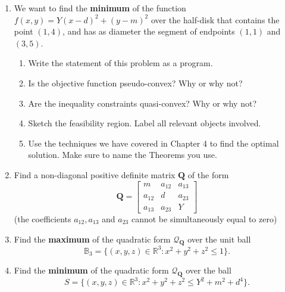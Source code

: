 \documentclass[11pt]{article}
\theoremstyle{definition}
\begin{document}
\begin{enumerate}
    \item We want to find the \textbf{minimum} of the function $f(x,y) = Y(x-d)^2 + (y-m)^2$ over the half-disk that contains the point $(1,4)$, and has as diameter the segment of endpoints $(1,1)$ and $(3,5)$.
    \begin{enumerate}
        \item Write the statement of this problem as a program.
        \item Is the objective function pseudo-convex?  Why or why not?
        \item Are the inequality constraints quasi-convex? Why or why not?
        \item Sketch the feasibility region. Label all relevant objects involved.
        \item Use the techniques we have covered in Chapter 4 to find the optimal solution.  Make sure to name the Theorems you use.
    \end{enumerate}
    \item Find a non-diagonal positive definite matrix $\boldsymbol{Q}$ of the form
    \begin{equation*}
    \boldsymbol{Q} = \begin{bmatrix} m & a_{12} & a_{13} \\ a_{12} & d & a_{23} \\ a_{13} & a_{23} & Y \end{bmatrix}
    \end{equation*}
    (the coefficients $a_{12}, a_{13}$ and $a_{23}$ cannot be simultaneously equal to zero)
    \item Find the \textbf{maximum} of the quadratic form $\mathcal{Q}_{\boldsymbol{Q}}$ over the unit ball 
    \begin{equation*}
    \mathbb{B}_3 = \{ (x,y,z) \in \mathbb{R}^3 : x^2+y^2+z^2 \leq 1 \}.
    \end{equation*}
    \item Find the \textbf{minimum} of the quadratic form $\mathcal{Q}_{\boldsymbol{Q}}$ over the ball 
    \begin{equation*}
    S = \{ (x,y,z) \in \mathbb{R}^3 : x^2+y^2+z^2 \leq Y^2+m^2+d^4 \}.
    \end{equation*}

\end{enumerate}
\end{document}
